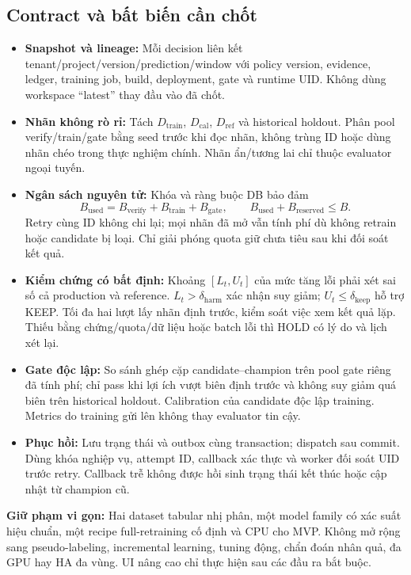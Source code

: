 \documentclass[11pt,a4paper]{article}
\begin{document}
\subsection{Contract và bất biến cần chốt}
\begin{itemize}
  \item \textbf{Snapshot và lineage:} Mỗi decision liên kết tenant/project/version/prediction/window với policy version, evidence, ledger, training job, build, deployment, gate và runtime UID. Không dùng workspace ``latest'' thay đầu vào đã chốt.
  \item \textbf{Nhãn không rò rỉ:} Tách $D_{\mathrm{train}}$, $D_{\mathrm{cal}}$, $D_{\mathrm{ref}}$ và historical holdout. Phân pool verify/train/gate bằng seed trước khi đọc nhãn, không trùng ID hoặc dùng nhãn chéo trong thực nghiệm chính. Nhãn ẩn/tương lai chỉ thuộc evaluator ngoại tuyến.
  \item \textbf{Ngân sách nguyên tử:} Khóa và ràng buộc DB bảo đảm
  \[
    B_{\mathrm{used}}=B_{\mathrm{verify}}+B_{\mathrm{train}}+B_{\mathrm{gate}},
    \qquad B_{\mathrm{used}}+B_{\mathrm{reserved}}\leq B.
  \]
  Retry cùng ID không chi lại; mọi nhãn đã mở vẫn tính phí dù không retrain hoặc candidate bị loại. Chỉ giải phóng quota giữ chưa tiêu sau khi đối soát kết quả.
  \item \textbf{Kiểm chứng có bất định:} Khoảng $[L_t,U_t]$ của mức tăng lỗi phải xét sai số cả production và reference. $L_t>\delta_{\mathrm{harm}}$ xác nhận suy giảm; $U_t\leq\delta_{\mathrm{keep}}$ hỗ trợ KEEP. Tối đa hai lượt lấy nhãn định trước, kiểm soát việc xem kết quả lặp. Thiếu bằng chứng/quota/dữ liệu hoặc batch lỗi thì HOLD có lý do và lịch xét lại.
  \item \textbf{Gate độc lập:} So sánh ghép cặp candidate--champion trên pool gate riêng đã tính phí; chỉ pass khi lợi ích vượt biên định trước và không suy giảm quá biên trên historical holdout. Calibration của candidate độc lập training. Metrics do training gửi lên không thay evaluator tin cậy.
  \item \textbf{Phục hồi:} Lưu trạng thái và outbox cùng transaction; dispatch sau commit. Dùng khóa nghiệp vụ, attempt ID, callback xác thực và worker đối soát UID trước retry. Callback trễ không được hồi sinh trạng thái kết thúc hoặc cập nhật từ champion cũ.
\end{itemize}

\textbf{Giữ phạm vi gọn:} Hai dataset tabular nhị phân, một model family có xác suất hiệu chuẩn, một recipe full-retraining cố định và CPU cho MVP. Không mở rộng sang pseudo-labeling, incremental learning, tuning động, chẩn đoán nhân quả, đa GPU hay HA đa vùng. UI nâng cao chỉ thực hiện sau các đầu ra bắt buộc.
\end{document}
